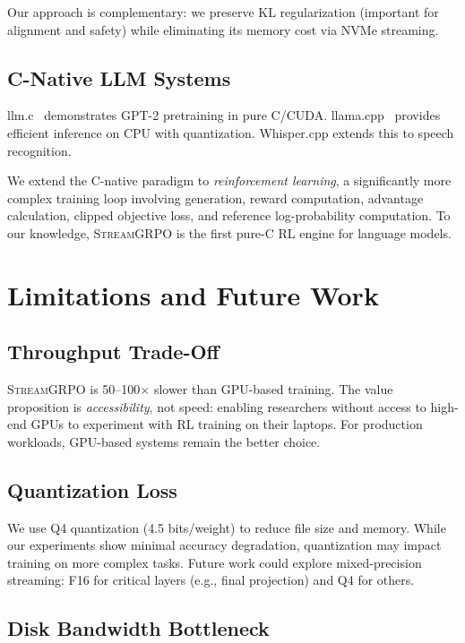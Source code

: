 \documentclass[sigconf,review,anonymous]{acmart}
\begin{document}
Our approach is complementary: we preserve KL regularization (important for alignment and safety) while eliminating its memory cost via NVMe streaming.

\subsection{C-Native LLM Systems}

llm.c~\cite{karpathy2024llmc} demonstrates GPT-2 pretraining in pure C/CUDA. llama.cpp~\cite{llamacpp2023} provides efficient inference on CPU with quantization. Whisper.cpp extends this to speech recognition.

We extend the C-native paradigm to \emph{reinforcement learning}, a significantly more complex training loop involving generation, reward computation, advantage calculation, clipped objective loss, and reference log-probability computation. To our knowledge, \textsc{StreamGRPO} is the first pure-C RL engine for language models.

\section{Limitations and Future Work}

\subsection{Throughput Trade-Off}

\textsc{StreamGRPO} is 50--100$\times$ slower than GPU-based training. The value proposition is \emph{accessibility}, not speed: enabling researchers without access to high-end GPUs to experiment with RL training on their laptops. For production workloads, GPU-based systems remain the better choice.

\subsection{Quantization Loss}

We use Q4 quantization (4.5 bits/weight) to reduce file size and memory. While our experiments show minimal accuracy degradation, quantization may impact training on more complex tasks. Future work could explore mixed-precision streaming: F16 for critical layers (e.g., final projection) and Q4 for others.

\subsection{Disk Bandwidth Bottleneck}
\end{document}
